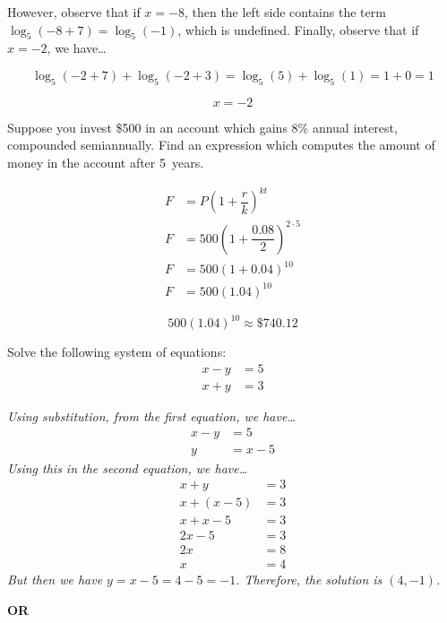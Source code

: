 \documentclass[12pt,letterpaper]{exam}
\begin{document}
\begin{questions}
{However, observe that if $x= -8$, then the left side contains the term $\log_5(-8 + 7)= \log_5(-1)$, which is undefined. Finally, observe that if $x= -2$, we have\dots

	\[
	\log_5(-2 + 7) + \log_5(-2 + 3)= \log_5(5) + \log_5(1)= 1 + 0= 1
	\] \pspace
	
	\[
	\boxed{x= -2}
	\]
}





\newpage
\question[5] Suppose you invest \$500 in an account which gains 8\% annual interest, compounded semiannually. Find an expression which computes the amount of money in the account after 5~years. \pspace

	\[
	\begin{aligned}
	F&= P \left(1 + \dfrac{r}{k} \right)^{kt} \\[0.3cm]
	F&= 500 \left(1 + \dfrac{0.08}{2} \right)^{2 \cdot 5} \\[0.3cm]
	F&= 500 \left(1 + 0.04 \right)^{10} \\[0.3cm]
	F&= 500 (1.04)^{10}
	\end{aligned}
	\] \pspace
	
	\[
	\boxed{500 (1.04)^{10} \approx \$740.12}
	\]





\newpage
\question[5] Solve the following system of equations:
	\[
	\begin{aligned}
	x - y&= 5 \\
	x + y&= 3
	\end{aligned}
	\] \pspace

{\itshape Using substitution, from the first equation, we have\dots
	\[
	\begin{aligned}
	x - y&= 5 \\
	y&= x - 5
	\end{aligned}
	\]
Using this in the second equation, we have\dots
	\[
	\begin{aligned}
	x + y&= 3 \\
	x + (x - 5)&= 3 \\
	x + x - 5&= 3 \\
	2x - 5&= 3 \\
	2x&= 8 \\
	x&= 4
	\end{aligned}
	\]
But then we have $y= x - 5= 4 - 5= -1$. Therefore, the solution is $(4, -1)$. 

	\begin{center} {\bfseries OR} \end{center}

}
\end{questions}
\end{document}
